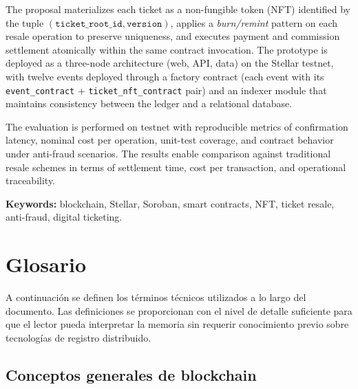 The proposal materializes each ticket as a non-fungible token (NFT) identified by the tuple \((\texttt{ticket\_root\_id}, \texttt{version})\), applies a \textit{burn/remint} pattern on each resale operation to preserve uniqueness, and executes payment and commission settlement atomically within the same contract invocation. The prototype is deployed as a three-node architecture (web, API, data) on the Stellar testnet, with twelve events deployed through a factory contract (each event with its \texttt{event\_contract} + \texttt{ticket\_nft\_contract} pair) and an indexer module that maintains consistency between the ledger and a relational database.

The evaluation is performed on testnet with reproducible metrics of confirmation latency, nominal cost per operation, unit-test coverage, and contract behavior under anti-fraud scenarios. The results enable comparison against traditional resale schemes in terms of settlement time, cost per transaction, and operational traceability.

\vspace{0.3cm}
\noindent\textbf{Keywords:} blockchain, Stellar, Soroban, smart contracts, NFT, ticket resale, anti-fraud, digital ticketing.

\newpage
\section*{Glosario}

A continuación se definen los términos técnicos utilizados a lo largo del documento. Las definiciones se proporcionan con el nivel de detalle suficiente para que el lector pueda interpretar la memoria sin requerir conocimiento previo sobre tecnologías de registro distribuido.

\subsection*{Conceptos generales de blockchain}

